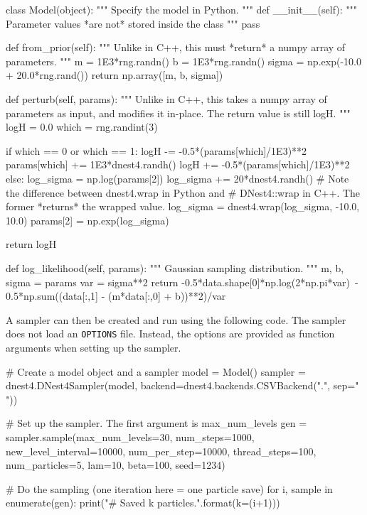 \documentclass[article, nojss]{jss}
\begin{document}
\begin{CodeChunk}
\begin{CodeInput}
class Model(object):
    """
    Specify the model in Python.
    """
    def __init__(self):
        """
        Parameter values *are not* stored inside the class
        """
        pass

    def from_prior(self):
        """
        Unlike in C++, this must *return* a numpy array of parameters.
        """
        m = 1E3*rng.randn()
        b = 1E3*rng.randn()
        sigma = np.exp(-10.0 + 20.0*rng.rand())
        return np.array([m, b, sigma])

    def perturb(self, params):
        """
        Unlike in C++, this takes a numpy array of parameters as input,
        and modifies it in-place. The return value is still logH.
        """
        logH = 0.0
        which = rng.randint(3)

        if which == 0 or which == 1:
            logH -= -0.5*(params[which]/1E3)**2
            params[which] += 1E3*dnest4.randh()
            logH += -0.5*(params[which]/1E3)**2
        else:
            log_sigma = np.log(params[2])
            log_sigma += 20*dnest4.randh()
            # Note the difference between dnest4.wrap in Python and
            # DNest4::wrap in C++. The former *returns* the wrapped value.
            log_sigma = dnest4.wrap(log_sigma, -10.0, 10.0)
            params[2] = np.exp(log_sigma)

        return logH

    def log_likelihood(self, params):
        """
        Gaussian sampling distribution.
        """
        m, b, sigma = params
        var = sigma**2
        return -0.5*data.shape[0]*np.log(2*np.pi*var)\
                - 0.5*np.sum((data[:,1] - (m*data[:,0] + b))**2)/var

\end{CodeInput}
\end{CodeChunk}

A sampler can then be created and run using the following code.
The  sampler does not load an {\tt OPTIONS} file.
Instead, the options are provided as function arguments
when setting up the sampler.
\begin{CodeChunk}
\begin{CodeInput}
# Create a model object and a sampler
model = Model()
sampler = dnest4.DNest4Sampler(model,
                               backend=dnest4.backends.CSVBackend(".",
                                                                  sep=" "))

# Set up the sampler. The first argument is max_num_levels
gen = sampler.sample(max_num_levels=30, num_steps=1000, new_level_interval=10000,
                      num_per_step=10000, thread_steps=100,
                      num_particles=5, lam=10, beta=100, seed=1234)

# Do the sampling (one iteration here = one particle save)
for i, sample in enumerate(gen):
    print("# Saved {k} particles.".format(k=(i+1)))
\end{CodeInput}
\end{CodeChunk}
\end{document}
